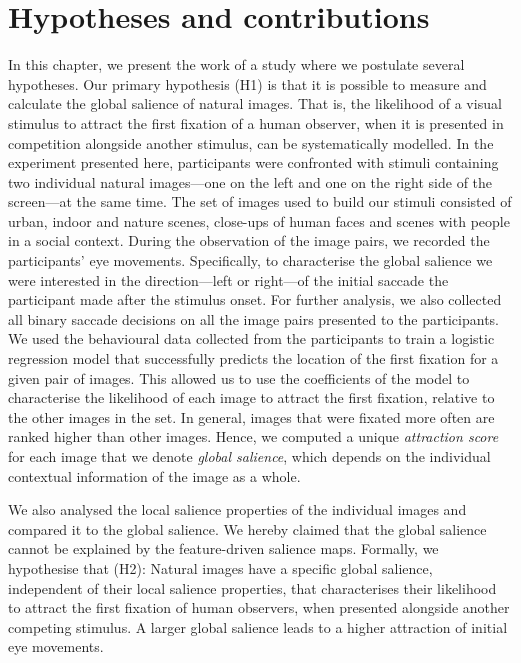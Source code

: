 {\section{Hypotheses and contributions}
\label{sec:globsal-contributions}
In this chapter, we present the work of a study where we postulate several hypotheses. Our primary hypothesis (H1) is that it is possible to measure and calculate the global salience of natural images. That is, the likelihood of a visual stimulus to attract the first fixation of a human observer, when it is presented in competition alongside another stimulus, can be systematically modelled. In the experiment presented here, participants were confronted with stimuli containing two individual natural images---one on the left and one on the right side of the screen---at the same time. The set of images used to build our stimuli consisted of urban, indoor and nature scenes, close-ups of human faces and scenes with people in a social context. During the observation of the image pairs, we recorded the participants' eye movements. Specifically, to characterise the global salience we were interested in the direction---left or right---of the initial saccade the participant made after the stimulus onset. For further analysis, we also collected all binary saccade decisions on all the image pairs presented to the participants. We used the behavioural data collected from the participants to train a logistic regression model that successfully predicts the location of the first fixation for a given pair of images. This allowed us to use the coefficients of the model to characterise the likelihood of each image to attract the first fixation, relative to the other images in the set. In general, images that were fixated more often are ranked higher than other images. Hence, we computed a unique \textit{attraction score} for each image that we denote \textit{global salience}, which depends on the individual contextual information of the image as a whole. 

We also analysed the local salience properties of the individual images and compared it to the global salience. We hereby claimed that the global salience cannot be explained by the feature-driven salience maps. Formally, we hypothesise that (H2): Natural images have a specific global salience, independent of their local salience properties, that characterises their likelihood to attract the first fixation of human observers, when presented alongside another competing stimulus. A larger global salience leads to a higher attraction of initial eye movements.  

}
